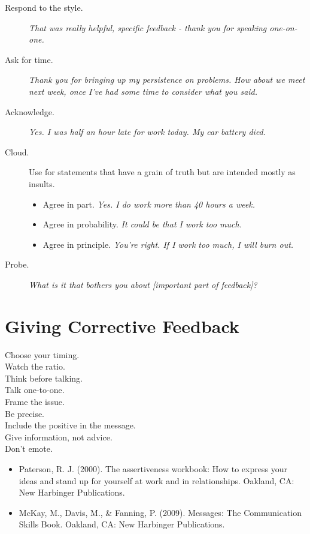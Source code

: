 \documentclass{article}
\begin{document}
\begin{multicols}{3}
\begin{description}
            \item[Respond to the style.] \emph{That was really helpful, specific feedback - thank you for speaking one-on-one.}
            \item[Ask for time.] \emph{Thank you for bringing up my persistence on problems. How about we meet next week, once I've had some time to consider what you said.}
            \item[Acknowledge.] \emph{Yes. I was half an hour late for work today. My car battery died.}
            \item[Cloud.] Use for statements that have a grain of truth but are intended mostly as insults.
              \begin{itemize}
                 \item Agree in part. \emph{Yes. I do work more than 40 hours a week.}
                 \item Agree in probability. \emph{It could be that I work too much.}
                 \item Agree in principle. \emph{You're right. If I work too much, I will burn out.}
              \end{itemize}
            \item[Probe.] \emph{What is it that bothers you about [important part of feedback]?}
         \end{description}
 
	\section*{Giving Corrective Feedback}

        \begin{description}
            \item[Choose your timing.]
            \item[Watch the ratio.]
            \item[Think before talking.]
            \item[Talk one-to-one.]
            \item[Frame the issue.]
            \item[Be precise.]
            \item[Include the positive in the message.]
            \item[Give information, not advice.]
            \item[Don't emote.]
        \end{description}

\end{multicols}

\begin{itemize}
    \item Paterson, R. J. (2000). The assertiveness workbook: How to express your ideas and stand up for yourself at work and in relationships. Oakland, CA: New Harbinger Publications.
    \item McKay, M., Davis, M., \& Fanning, P. (2009). Messages: The Communication Skills Book. Oakland, CA: New Harbinger Publications.
\end{itemize}
\end{document}
